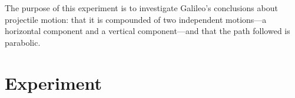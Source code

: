 The purpose of this experiment is to investigate Galileo's conclusions
about projectile motion:  that it is compounded of two
independent motions---a horizontal component and a vertical
component---and that the path followed is parabolic.

\section*{Experiment}


